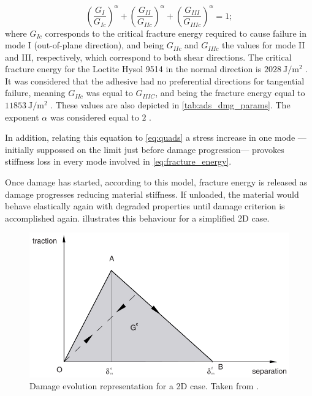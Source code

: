 \documentclass[cmfonts]{witpress}
\begin{document}
\begin{equation}
\left(\frac{G_{I}}{G_{Ic}}\right)^{\alpha}+\left(\frac{G_{II}}{G_{IIc}}\right)^{\alpha}+\left(\frac{G_{III}}{G_{IIIc}}\right)^{\alpha}=1 ;
\label{eq:fracture_energy}
\end{equation}
where $G_{Ic}$ corresponds to the critical fracture energy required to cause failure in mode I (out-of-plane direction), and being $G_{IIc}$ and $G_{IIIc}$ the values for mode II and III, respectively, which correspond to both shear directions. The critical fracture energy for the Loctite Hysol 9514 in the normal direction is $\SI{2028}{\J/\m^2}$ \cite{Scattina2011}. It was considered that the adhesive had no preferential directions for tangential failure, meaning $G_{IIc}$ was equal to $G_{IIIC}$, and being the fracture energy equal to $\SI{11853}{\J/\m^2}$ \cite{Scattina2011}. These values are also depicted in \cref{tab:ads_dmg_params}. The exponent $\alpha$ was considered equal to $\num{2}$ \cite{Loureiro2010, Sadowski2010, Sadowski2011, Sadowski2014, SernaMoreno2015}.

In addition, relating this equation to \cref{eq:quads} a stress increase in one mode ---initially suppossed on the limit just before damage progression--- provokes stiffness loss in every mode involved in \cref{eq:fracture_energy}.

Once damage has started, according to this model, fracture energy is released as damage progresses reducing material stiffness. If unloaded, the material would behave elastically again with degraded properties until damage criterion is accomplished again.  illustrates this behaviour for a simplified 2D case.

\begin{figure}
	\centering
	\includegraphics[width=0.7\linewidth]{figures/IMG_CUTRES/damage_evolution_manual.pdf}
	\caption[Damage evolution representation for a 2D case.]{Damage evolution representation for a 2D case. Taken from \cite{Abaqus613Manual}.}
	\label{fig:damage_evo2D}
\end{figure}
\end{document}
